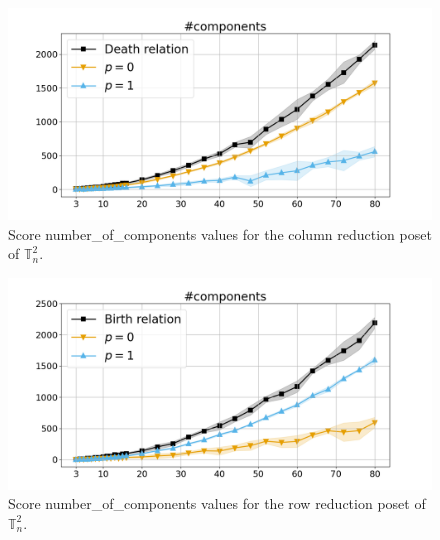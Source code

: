 \documentclass{article}
\begin{document}
    \begin{figure}[h!]
        \centering
        \hspace*{-0.24\textwidth}
        \includegraphics[width=1.4\textwidth]{pics/extended torus scores/score=number-of-components, dim=2, object=column reduction.png}
        \caption{Score number\_of\_components values for the column reduction poset of $\mathbb{T}_n^{2}$.}
        \label{fig:numberofcomponents-columnreduction2}
    \end{figure}
    \begin{figure}[h!]
        \centering
        \hspace*{-0.24\textwidth}
        \includegraphics[width=1.4\textwidth]{pics/extended torus scores/score=number-of-components, dim=2, object=row reduction.png}
        \caption{Score number\_of\_components values for the row reduction poset of $\mathbb{T}_n^{2}$.}
        \label{fig:numberofcomponents-rowreduction2}
    \end{figure}
\end{document}
